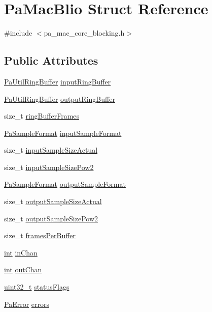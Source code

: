 \hypertarget{struct_pa_mac_blio}{}\section{Pa\+Mac\+Blio Struct Reference}
\label{struct_pa_mac_blio}


{\ttfamily \#include $<$pa\+\_\+mac\+\_\+core\+\_\+blocking.\+h$>$}

\subsection*{Public Attributes}
\begin{DoxyCompactItemize}
\item 
\hyperlink{struct_pa_util_ring_buffer}{Pa\+Util\+Ring\+Buffer} \hyperlink{struct_pa_mac_blio_ac5d481b523679d409641bb47a9aaf428}{input\+Ring\+Buffer}
\item 
\hyperlink{struct_pa_util_ring_buffer}{Pa\+Util\+Ring\+Buffer} \hyperlink{struct_pa_mac_blio_af6e4305d4f3283d44a6d0a1817f06334}{output\+Ring\+Buffer}
\item 
size\+\_\+t \hyperlink{struct_pa_mac_blio_ae06f808f0742b1389f919084f5beb20b}{ring\+Buffer\+Frames}
\item 
\hyperlink{portaudio_8h_a4582d93c2c2e60e12be3d74c5fe00b96}{Pa\+Sample\+Format} \hyperlink{struct_pa_mac_blio_a07556d84ca8990b8929dbf4f65168270}{input\+Sample\+Format}
\item 
size\+\_\+t \hyperlink{struct_pa_mac_blio_ac86932d0b166bb08c487a8e65fb74236}{input\+Sample\+Size\+Actual}
\item 
size\+\_\+t \hyperlink{struct_pa_mac_blio_a707dff02b4c42f8088af8b63ec27f702}{input\+Sample\+Size\+Pow2}
\item 
\hyperlink{portaudio_8h_a4582d93c2c2e60e12be3d74c5fe00b96}{Pa\+Sample\+Format} \hyperlink{struct_pa_mac_blio_a712ef9ce43a8508c690ccca94a59ae32}{output\+Sample\+Format}
\item 
size\+\_\+t \hyperlink{struct_pa_mac_blio_a825d5ebea6f15c42f389f51ed5b10723}{output\+Sample\+Size\+Actual}
\item 
size\+\_\+t \hyperlink{struct_pa_mac_blio_ac4d6907ab5fbc49cc472849b5be0f1c7}{output\+Sample\+Size\+Pow2}
\item 
size\+\_\+t \hyperlink{struct_pa_mac_blio_a58b14c4a9a8a901e7a50cbd096314c50}{frames\+Per\+Buffer}
\item 
\hyperlink{xmltok_8h_a5a0d4a5641ce434f1d23533f2b2e6653}{int} \hyperlink{struct_pa_mac_blio_a71952c2be07f5b97adc8ec1d2402ab45}{in\+Chan}
\item 
\hyperlink{xmltok_8h_a5a0d4a5641ce434f1d23533f2b2e6653}{int} \hyperlink{struct_pa_mac_blio_a67e340aa158be01fa97ba700699e627a}{out\+Chan}
\item 
\hyperlink{lib-src_2ffmpeg_2win32_2stdint_8h_a6eb1e68cc391dd753bc8ce896dbb8315}{uint32\+\_\+t} \hyperlink{struct_pa_mac_blio_a0535aaa4f74b2ae10ac0c7fd561bd4ee}{status\+Flags}
\item 
\hyperlink{portaudio_8h_a4949e4a8ef9f9dbe8cbee414ce69841d}{Pa\+Error} \hyperlink{struct_pa_mac_blio_a6daa032e896cb3e63523ee30fa5beca5}{errors}
\end{DoxyCompactItemize}


